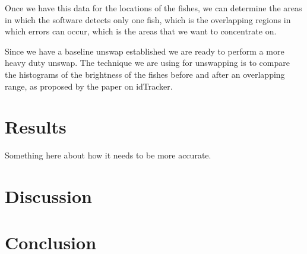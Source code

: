 \documentclass[12pt]{article}
\begin{document}
Once we have this data for the locations of the fishes, we can determine the areas in which the software detects only one fish, which is the overlapping regions in which errors can occur, which is the areas that we want to concentrate on.

Since we have a baseline unswap established we are ready to perform a more heavy duty unswap. The technique we are using for unswapping is to compare the histograms of the brightness of the fishes before and after an overlapping range, as proposed by the paper on idTracker.

\section{Results}

Something here about how it needs to be more accurate. 

\section{Discussion}


\section{Conclusion}
\end{document}
